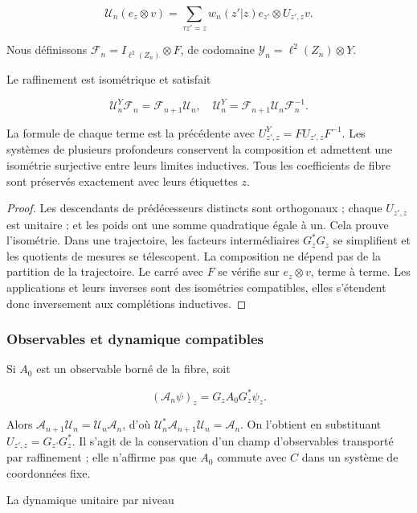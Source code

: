\[
\mathscr U_n(e_z\otimes v)
=\sum_{\tau z'=z}w_n(z'|z)e_{z'}\otimes U_{z',z}v.
\]

Nous définissons \(\mathscr F_n=I_{\ell^2(Z_n)}\otimes F\), de codomaine \(\mathscr Y_n=\ell^2(Z_n)\otimes Y\).


\begin{theorem}
Le raffinement est isométrique et satisfait


\[
\mathscr U^Y_n\mathscr F_n=\mathscr F_{n+1}\mathscr U_n,
\quad
\mathscr U^Y_n=\mathscr F_{n+1}\mathscr U_n\mathscr F_n^{-1}.
\]

La formule de chaque terme est la précédente avec \(U^Y_{z',z}=FU_{z',z}F^{-1}\). Les systèmes de plusieurs profondeurs conservent la composition et admettent une isométrie surjective entre leurs limites inductives. Tous les coefficients de fibre sont préservés exactement avec leurs étiquettes \(z\).

\end{theorem}

\begin{proof}
Les descendants de prédécesseurs distincts sont orthogonaux ; chaque \(U_{z',z}\) est unitaire ; et les poids ont une somme quadratique égale à un. Cela prouve l’isométrie. Dans une trajectoire, les facteurs intermédiaires \(G_z^*G_z\) se simplifient et les quotients de mesures se télescopent. La composition ne dépend pas de la partition de la trajectoire. Le carré avec \(F\) se vérifie sur \(e_z\otimes v\), terme à terme. Les applications et leurs inverses sont des isométries compatibles, elles s’étendent donc inversement aux complétions inductives.
\end{proof}

\subsubsection{Observables et dynamique compatibles}

Si \(A_0\) est un observable borné de la fibre, soit

\[
(\mathscr A_n\psi)_z=G_zA_0G_z^*\psi_z.
\]

Alors \(\mathscr A_{n+1}\mathscr U_n=\mathscr U_n\mathscr A_n\), d’où \(\mathscr U_n^*\mathscr A_{n+1}\mathscr U_n=\mathscr A_n\). On l’obtient en substituant \(U_{z',z}=G_{z'}G_z^*\). Il s’agit de la conservation d’un champ d’observables transporté par raffinement ; elle n’affirme pas que \(A_0\) commute avec \(C\) dans un système de coordonnées fixe.

La dynamique unitaire par niveau


